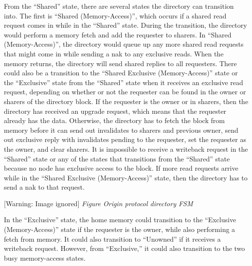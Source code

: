\documentclass[letterpaper]{article}
\newcounter{Figure}
\renewcommand\theFigure{\arabic{Figure}}
\begin{document}
From the ``Shared'' state, there are several states the directory can transition into. The first is ``Shared (Memory-Access)'', which occurs if a shared read request comes in while in the ``Shared'' state. During the transition, the directory would perform a memory fetch and add the requester to sharers. In ``Shared (Memory-Access)'', the directory would queue up any more shared read requests that might come in while sending a nak to any exclusive reads. When the memory returns, the directory will send shared replies to all requesters. There could also be a transition to the ``Shared Exclusive (Memory-Access)'' state or the ``Exclusive'' state from the ``Shared'' state when it receives an exclusive read request, depending on whether or not the requester can be found in the owner or sharers of the directory block. If the requester is the owner or in sharers, then the directory has received an upgrade request, which means that the requester already has the data. Otherwise, the directory has to fetch the block from memory before it can send out invalidates to sharers and previous owner, send out exclusive reply with invalidates pending to the requester, set the requester as the owner, and clear sharers. It is impossible to receive a writeback request in the ``Shared'' state or any of the states that transitions from the ``Shared'' state because no node has exclusive access to the block. If more read requests arrive while in the ``Shared Exclusive (Memory-Access)'' state, then the directory has to send a nak to that request.

\begin{minipage}{6.5in}


 [Warning: Image ignored] %
{\itshape
Figure {\theFigure\label{seq:refFigure3}} Origin protocol directory FSM}
\end{minipage}In the ``Exclusive'' state, the home memory could transition to the ``Exclusive (Memory-Access)'' state if the requester is the owner, while also performing a fetch from memory. It could also transition to ``Unowned'' if it receives a writeback request. However, from ``Exclusive,'' it could also transition to the two busy memory-access states.
\end{document}
